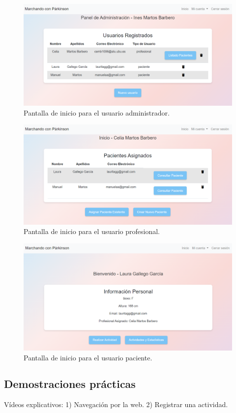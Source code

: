 \begin{figure}[h]
    \centering
    \includegraphics[width=1\textwidth]{img/B3_Manual/InicioAdmin.png}
    \caption{Pantalla de inicio para el usuario administrador.}
    \label{fig:InicioAdmin}
\end{figure}

\begin{figure}[h]
    \centering
    \includegraphics[width=1\textwidth]{img/B3_Manual/InicioProf.png}
    \caption{Pantalla de inicio para el usuario profesional.}
    \label{fig:InicioProf}
\end{figure}
    
\begin{figure}[h]
    \centering
    \includegraphics[width=1\textwidth]{img/B3_Manual/InicioPaciente.png}
    \caption{Pantalla de inicio para el usuario paciente.}
    \label{fig:InicioPaciente}
\end{figure}

\subsection{Demostraciones prácticas}

Vídeos explicativos:
    1) Navegación por la web.
    2) Registrar una actividad.

    